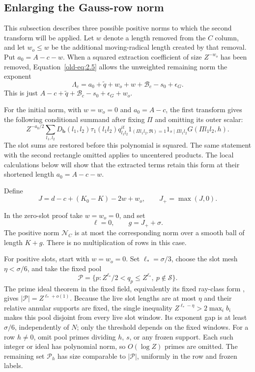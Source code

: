 \documentclass[12pt]{article}
\begin{document}
\subsection{Enlarging the Gauss-row norm}\label{sec:plain-gauss-enlargement}

This subsection describes three possible positive norms to which
the second transform will be applied.  Let \(w\) denote a length
removed from the \(C\) column, and let \(w_o\le w\) be the
additional moving-radical length created by that removal.  Put
\(a_0=A-c-w\).  When a squared extraction coefficient of size
\(Z^{-w_o}\) has been removed, Equation~\eqref{old-eq:2.5}
allows the unweighted remaining norm the exponent
\begin{equation}
 \Lambda_c=
 a_0+\widetilde q+w_o+w+\mathcal B_c-s_0+\epsilon_G.
 \label{old-eq:2.7}
\end{equation}
This is just \(A-c+\widetilde q+\mathcal B_c-s_0+\epsilon_G+w_o\).

For the initial norm, with \(w=w_o=0\) and \(a_0=A-c\), the first
transform gives the following conditional summand after fixing \(\Pi\)
and omitting its outer scalar:
\begin{equation}
 Z^{-a_0/2}\sum_{l_1,l_2}
 D_{\mathbf b}(l_1,l_2)\tau_1(l_1l_2)q_{l_1l_2}^{it}
 1_{(\Pi l_1l_2,\mathfrak R)=1}1_{s\mid\Pi l_1l_2}
 G(\Pi l_1l_2,h).
 \label{old-eq:2.18c}
\end{equation}
The slot sums are restored before this polynomial is squared.
The same statement with the second rectangle omitted applies to
uncentered products.  The local calculations below will show that the
extracted terms retain this form at their shortened length \(a_0=A-c-w\).

Define
\begin{equation}
 J=d-c+(K_0-K)-2w+w_o,\qquad J_+=\max(J,0).
 \label{old-eq:2.8}
\end{equation}

In the zero-slot proof take \(w=w_o=0\), and set
\[
 \ell=0,\qquad g=J_++\sigma.
\]
The positive norm \(\mathcal N_C\) is at most the corresponding
norm over a smooth ball of length \(K+g\).  There is no
multiplication of rows in this case.

For positive slots, start with \(w=w_o=0\).  Set
\(\ell_*=\sigma/3\), choose the slot mesh \(\eta<\sigma/6\),
and take the fixed pool
\[
 \mathcal P=\{p: Z^{\ell_*}/2<q_p\le Z^{\ell_*},\
                    p\notin\mathcal S\}.
\]
The prime ideal theorem in the fixed field, equivalently its fixed
ray-class form \cite[Theorem 1.1]{TZ}, gives
\(|\mathcal P|=Z^{\ell_*+o(1)}\).  Because the live slot lengths
are at most \(\eta\) and their relative annular supports are fixed,
the single inequality
\(Z^{\ell_*-\eta}>2\max_i b_i\) makes this pool disjoint from
every live slot window.  Its exponent gap is at least \(\sigma/6\),
independently of \(N\); only the threshold depends on the fixed
windows.  For a row \(h\ne0\), omit pool primes dividing
\(h\), \(s\), or any frozen support.  Each such integer or ideal
has polynomial norm, so \(O(\log Z)\) primes are omitted.
The remaining set \(\mathcal P_h\) has size comparable to
\(|\mathcal P|\), uniformly in the row and frozen labels.
\end{document}
